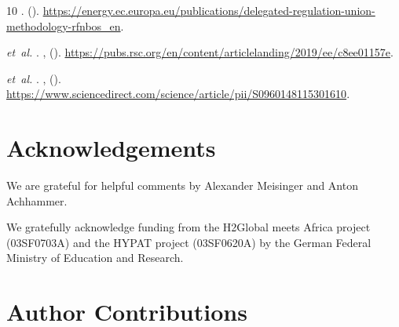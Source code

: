 \documentclass[5p,numafflabel]{elsarticle}
\begin{document}
\begin{thebibliography}{10}
\newblock {}.
\newblock {} ().
\newblock
  \urlprefix\url{https://energy.ec.europa.eu/publications/delegated-regulation-union-methodology-rfnbos_en}.

 \emph{et~al.}
\newblock {}.
\newblock \emph{}
  \textbf{}, 
  ().
\newblock
  \urlprefix\url{https://pubs.rsc.org/en/content/articlelanding/2019/ee/c8ee01157e}.

 \emph{et~al.}
\newblock {}.
\newblock \emph{}
  \textbf{}, 
  ().
\newblock
  \urlprefix\url{https://www.sciencedirect.com/science/article/pii/S0960148115301610}.

\end{thebibliography}



\section*{Acknowledgements}

We are grateful for helpful comments by Alexander Meisinger and Anton Achhammer.

We gratefully acknowledge funding from the H2Global meets Africa project (03SF0703A) and the HYPAT project (03SF0620A) by the German Federal Ministry of Education and Research.



\section*{Author Contributions}

\end{document}
